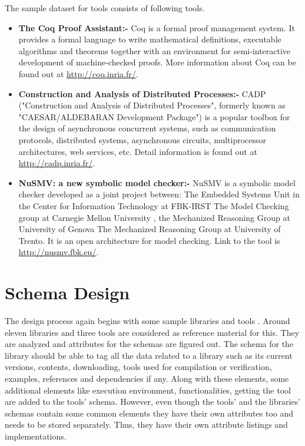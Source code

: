 \documentclass[11pt,letterpaper]{report}
\begin{document}
The sample dataset for tools consists of following tools.
\begin{itemize}
\item \textbf{The Coq Proof Assistant:- } Coq is a formal proof management system. It provides a formal language to write mathematical definitions, executable algorithms and theorems together with an environment for semi-interactive development of machine-checked proofs. More information about Coq can be found out at \url{http://coq.inria.fr/}. \cite{COQ}
\item \textbf{Construction and Analysis of Distributed Processes:- } CADP ("Construction and Analysis of Distributed Processes", formerly known as "CAESAR/ALDEBARAN Development Package") is a popular toolbox for the design of asynchronous concurrent systems, such as communication protocols, distributed systems, asynchronous circuits, multiprocessor architectures, web services, etc. Detail information is found out at \url{http://cadp.inria.fr/}. \cite{CADP}
\item \textbf{NuSMV: a new symbolic model checker:- } NuSMV is a symbolic model checker developed as a joint project between: The Embedded Systems Unit in the Center for Information Technology at FBK-IRST The Model Checking group at Carnegie Mellon University , the Mechanized Reasoning Group at University of Genova The Mechanized Reasoning Group at University of Trento. It is an open architecture for model checking. Link to the tool is \url{http://nusmv.fbk.eu/}. \cite{NUSMV}
\end{itemize}
\section{Schema Design}
The design process again begins with some sample libraries and tools \cite{Alea, DFC, MCHIP, BCastleJava, BSharp,Glibc,COQ,CADP,STL,NUSMV,SMPS}. Around eleven libraries and three tools are considered as reference material for this.  They are analyzed and attributes for the schemas are figured out. The schema for the library should be able to tag all the data related to a library such as its current versions, contents, downloading, tools used for compilation or verification, examples, references and dependencies if any. Along with these elements, some additional elements like execution environment, functionalities, getting the tool are added to the tools' schema. However, even though the tools' and the libraries' schemas contain some common elements they have their own attributes too and needs to be stored separately. Thus, they have their own attribute listings and implementations.
\end{document}
